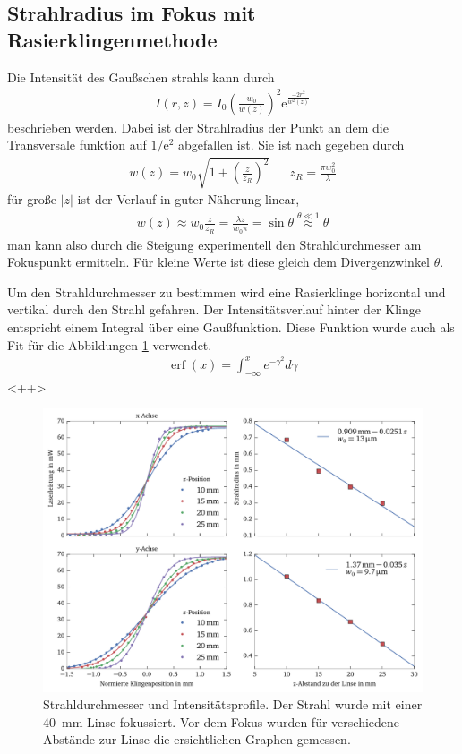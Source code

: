 \documentclass[11pt,twoside=true]{scrartcl}
\newcommand{\e}{\mathrm{e}}
\begin{document}
\subsection{Strahlradius im Fokus mit Rasierklingenmethode}
Die Intensität des Gaußschen strahls kann durch
%
\begin{align*}
  I(r, z) = I_0\left( \frac{w_0}{w(z)} \right)^2 \e^{\frac{-2 r^2}{w^2(z)}}
\end{align*}
%
beschrieben werden. Dabei ist der Strahlradius der Punkt an
dem die Transversale funktion auf $1/\e^2$ abgefallen ist. Sie ist 
nach \cite{gaussbeamwiki} gegeben durch
%
\begin{align*}
  w(z) = w_0 \sqrt{1 + \left( \frac{z}{z_R} \right)^2} && z_R = \frac{\pi w_0^2}{\lambda}
\end{align*}
%
für große $|z|$ ist der Verlauf in guter Näherung linear,
%
\begin{align*}
  w(z) \approx w_0 \frac{z}{z_R} = \frac{\lambda z}{w_0 \pi} = \sin{\theta} 
                      \overset{\theta \ll 1}{\approx} \theta
\end{align*}
%
man kann also durch die Steigung experimentell den Strahldurchmesser
am Fokuspunkt ermitteln. Für kleine Werte ist diese gleich dem Divergenzwinkel
$\theta$. 

Um den Strahldurchmesser zu bestimmen wird eine Rasierklinge horizontal und
vertikal durch den Strahl gefahren. Der Intensitätsverlauf hinter der Klinge
entspricht einem Integral über eine Gaußfunktion. Diese Funktion wurde auch
als Fit für die Abbildungen \ref{fig:beam_div} verwendet.
%
\begin{align*}
  \operatorname{erf}(x) = \int_{-\infty}^{x} e^{-\gamma^2} d\gamma
\end{align*}
%
<++>

\begin{figure}[h!]
  \centering
  \includegraphics[width=1\textwidth]{./figures/beam_div.pdf}
  \caption{Strahldurchmesser und Intensitätsprofile. Der Strahl wurde mit einer
  \SI{40}{\milli\metre} Linse fokussiert. Vor dem Fokus wurden für verschiedene 
  Abstände zur Linse die ersichtlichen Graphen gemessen.}
  \label{fig:beam_div}
\end{figure}
\end{document}
